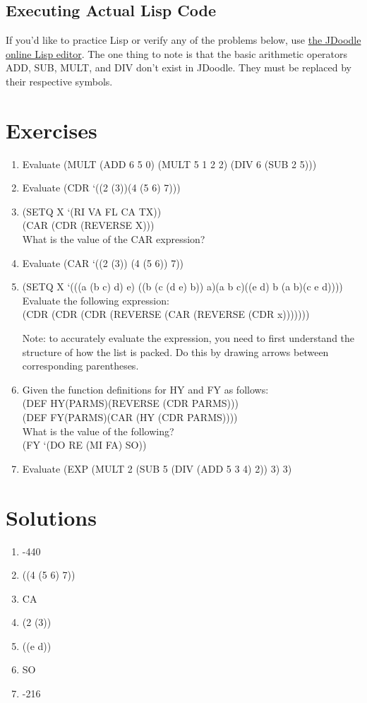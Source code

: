 \documentclass{pset_template}
\begin{document}
\subsection{Executing Actual Lisp Code}
If you'd like to practice Lisp or verify any of the problems below, use
\href{https://www.jdoodle.com/execute-clisp-online}{the JDoodle online Lisp editor}.
The one thing to note is that the basic arithmetic operators ADD, SUB, MULT, and DIV
don't exist in JDoodle.
They must be replaced by their respective symbols.

\section{Exercises}
\begin{enumerate}
    \item Evaluate (MULT (ADD 6 5 0) (MULT 5 1 2 2) (DIV 6 (SUB 2 5)))
    \item Evaluate (CDR `((2 (3))(4 (5 6) 7)))
    \item (SETQ X `(RI VA FL CA TX))\\
    (CAR (CDR (REVERSE X)))\\
    What is the value of the CAR expression?
    \item Evaluate (CAR `((2 (3)) (4 (5 6)) 7))
    \item (SETQ X `(((a (b c) d) e) ((b (c (d e) b)) a)(a b c)((e d) b (a b)(c e d))))\\
    Evaluate the following expression:\\
    (CDR (CDR (CDR (REVERSE (CAR (REVERSE (CDR x)))))))

    Note: to accurately evaluate the expression,
    you need to first understand the structure
    of how the list is packed.
    Do this by drawing arrows between corresponding parentheses.

    \item Given the function definitions for HY and FY as follows:\\
    (DEF HY(PARMS)(REVERSE (CDR PARMS)))\\
    (DEF FY(PARMS)(CAR (HY (CDR PARMS))))\\
    What is the value of the following?\\
    (FY `(DO RE (MI FA) SO))
    \item Evaluate
    (EXP (MULT 2 (SUB 5 (DIV (ADD 5 3 4) 2)) 3) 3)
\end{enumerate}

\newpage
\section{Solutions}
\begin{enumerate}
    \item -440
    \item ((4 (5 6) 7))
    \item CA
    \item (2 (3))
    \item ((e d))
    \item SO
    \item -216
\end{enumerate}
\end{document}
